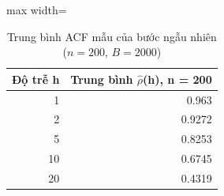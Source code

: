 \begin{table}[H]
\centering\footnotesize
\caption{Trung bình ACF mẫu của bước ngẫu nhiên ($n=200$, $B=2000$)}\label{tab:tab_b12_02_rw_sample_acf}
\begin{adjustbox}{max width=\linewidth}
\begin{tabular}{|r|r|}
\toprule
Độ trễ h & Trung bình $\hat{\rho}$(h), n = 200 \\
\midrule
1 & 0.963 \\
2 & 0.9272 \\
5 & 0.8253 \\
10 & 0.6745 \\
20 & 0.4319 \\
\bottomrule
\end{tabular}
\end{adjustbox}
\end{table}
